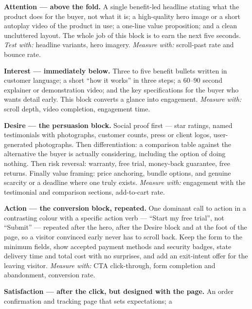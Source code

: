 \begin{qlist}
\begin{apts}
\item \textbf{Attention --- above the fold.} A single benefit-led headline
      stating what the product does for the buyer, not what it is; a
      high-quality hero image or a short autoplay video of the product in use;
      a one-line value proposition; and a clean uncluttered layout. The whole
      job of this block is to earn the next five seconds. \emph{Test with:}
      headline variants, hero imagery. \emph{Measure with:} scroll-past rate
      and bounce rate.
\item \textbf{Interest --- immediately below.} Three to five benefit bullets
      written in customer language; a short ``how it works'' in three steps; a
      60--90 second explainer or demonstration video; and the key
      specifications for the buyer who wants detail early. This block converts
      a glance into engagement. \emph{Measure with:} scroll depth, video
      completion, engagement time.
\item \textbf{Desire --- the persuasion block.} Social proof first --- star
      ratings, named testimonials with photographs, customer counts, press or
      client logos, user-generated photographs. Then differentiation: a
      comparison table against the alternative the buyer is actually
      considering, including the option of doing nothing. Then risk reversal:
      warranty, free trial, money-back guarantee, free returns. Finally value
      framing: price anchoring, bundle options, and genuine scarcity or a
      deadline where one truly exists. \emph{Measure with:} engagement with the
      testimonial and comparison sections, add-to-cart rate.
\item \textbf{Action --- the conversion block, repeated.} One dominant call to
      action in a contrasting colour with a specific action verb --- ``Start my
      free trial'', not ``Submit'' --- repeated after the hero, after the
      Desire block and at the foot of the page, so a visitor convinced early
      never has to scroll back. Keep the form to the minimum fields, show
      accepted payment methods and security badges, state delivery time and
      total cost with no surprises, and add an exit-intent offer for the
      leaving visitor. \emph{Measure with:} CTA click-through, form completion
      and abandonment, conversion rate.
\item \textbf{Satisfaction --- after the click, but designed with the page.}
      An order confirmation and tracking page that sets expectations; a

\end{apts}
\end{qlist}
